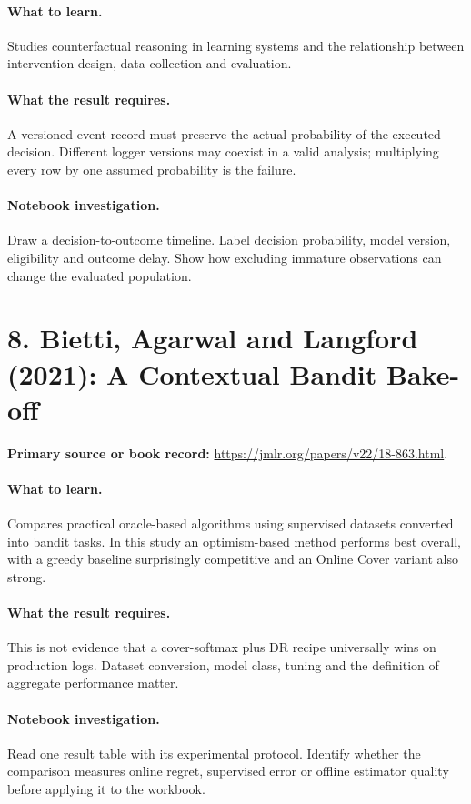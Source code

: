 \documentclass[11pt]{scrartcl}
\begin{document}
\paragraph{What to learn.} Studies counterfactual reasoning in learning systems and the relationship between intervention design, data collection and evaluation.

\paragraph{What the result requires.} A versioned event record must preserve the actual probability of the executed decision. Different logger versions may coexist in a valid analysis; multiplying every row by one assumed probability is the failure.

\paragraph{Notebook investigation.} Draw a decision-to-outcome timeline. Label decision probability, model version, eligibility and outcome delay. Show how excluding immature observations can change the evaluated population.

\section*{8. Bietti, Agarwal and Langford (2021): A Contextual Bandit Bake-off}
\textbf{Primary source or book record:} \url{https://jmlr.org/papers/v22/18-863.html}.

\paragraph{What to learn.} Compares practical oracle-based algorithms using supervised datasets converted into bandit tasks. In this study an optimism-based method performs best overall, with a greedy baseline surprisingly competitive and an Online Cover variant also strong.

\paragraph{What the result requires.} This is not evidence that a cover-softmax plus DR recipe universally wins on production logs. Dataset conversion, model class, tuning and the definition of aggregate performance matter.

\paragraph{Notebook investigation.} Read one result table with its experimental protocol. Identify whether the comparison measures online regret, supervised error or offline estimator quality before applying it to the workbook.
\end{document}
